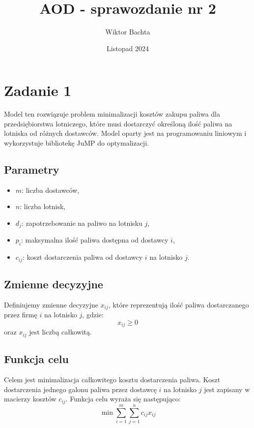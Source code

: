 \documentclass[12pt, letterpaper]{article}
\title{AOD - sprawozdanie nr 2}
\author{Wiktor Bachta}
\date{Listopad 2024}
\begin{document}
\maketitle

\section{Zadanie 1}

Model ten rozwiązuje problem minimalizacji kosztów zakupu paliwa dla
przedsiębiorstwa lotniczego, które musi dostarczyć określoną ilość paliwa na
lotniska od różnych dostawców. Model oparty jest na programowaniu
liniowym i wykorzystuje bibliotekę JuMP do optymalizacji.

\subsection{Parametry}
\begin{itemize}
  \item \( m \): liczba dostawców,
  \item \( n \): liczba lotnisk,
  \item \( d_j \): zapotrzebowanie na paliwo na lotnisku \( j \),
  \item \( p_i \): maksymalna ilość paliwa dostępna od dostawcy \( i \),
  \item \( c_{ij} \): koszt dostarczenia paliwa od dostawcy \( i \) na lotnisko
        \( j \).
\end{itemize}

\subsection{Zmienne decyzyjne}
Definiujemy zmienne decyzyjne \( x_{ij} \), które reprezentują ilość paliwa
dostarczanego przez firmę \( i \) na lotnisko \( j \), gdzie:
\[
  x_{ij} \geq 0
\]
oraz \( x_{ij} \) jest liczbą całkowitą.

\subsection{Funkcja celu}
Celem jest minimalizacja całkowitego kosztu dostarczenia paliwa. Koszt
dostarczenia jednego galonu paliwa przez dostawcę \( i \) na lotnisko \( j \)
jest zapisany w macierzy kosztów \( c_{ij} \). Funkcja celu wyraża się
następująco:
\[
  \min \sum_{i=1}^m \sum_{j=1}^n c_{ij} x_{ij}
\]
\end{document}
